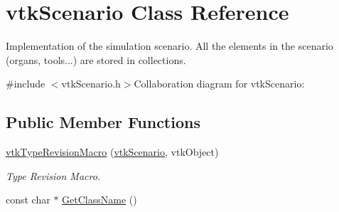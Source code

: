 \hypertarget{classvtkScenario}{
\section{vtkScenario Class Reference}
\label{classvtkScenario}
}


Implementation of the simulation scenario. All the elements in the scenario (organs, tools...) are stored in collections.  


{\ttfamily \#include $<$vtkScenario.h$>$}Collaboration diagram for vtkScenario:\subsection*{Public Member Functions}
\begin{DoxyCompactItemize}
\item 
\hypertarget{classvtkScenario_a11452103786c5dcd3dd092437682022f}{
\hyperlink{classvtkScenario_a11452103786c5dcd3dd092437682022f}{vtkTypeRevisionMacro} (\hyperlink{classvtkScenario}{vtkScenario}, vtkObject)}
\label{classvtkScenario_a11452103786c5dcd3dd092437682022f}

\begin{DoxyCompactList}\small\item\em Type Revision Macro. \item\end{DoxyCompactList}\item 
\hypertarget{classvtkScenario_a1ee87449d9523ba2b96ed4ef5aa66b06}{
const char $\ast$ \hyperlink{classvtkScenario_a1ee87449d9523ba2b96ed4ef5aa66b06}{GetClassName} ()}
\label{classvtkScenario_a1ee87449d9523ba2b96ed4ef5aa66b06}


\end{DoxyCompactItemize}
